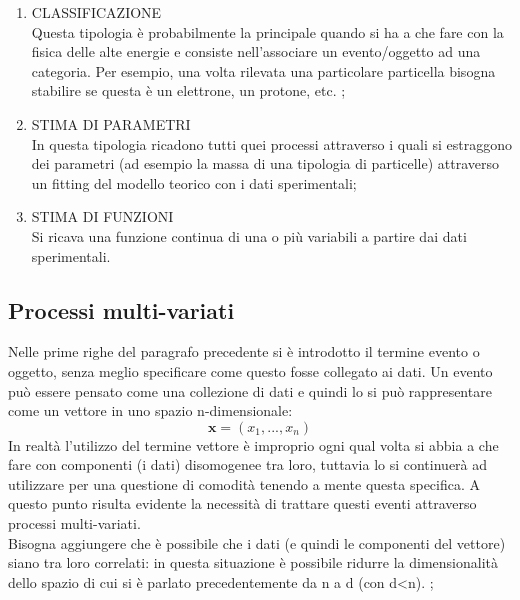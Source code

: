 	\begin{enumerate}
		\item CLASSIFICAZIONE \\
			Questa tipologia è probabilmente la principale quando si ha a che fare con la fisica delle alte energie e consiste nell'associare un evento/oggetto  ad una categoria. Per esempio, una volta rilevata una particolare particella bisogna stabilire se questa è un elettrone, un protone, etc.  ;
 
		\item STIMA DI PARAMETRI \\
			In questa tipologia ricadono tutti quei processi attraverso i quali si estraggono dei parametri (ad esempio la massa di una tipologia di particelle) attraverso un fitting del modello teorico con i dati sperimentali;
		\item STIMA DI FUNZIONI \\
			Si ricava una funzione continua di una o più variabili a partire dai dati sperimentali.
	\end{enumerate}

\subsection{Processi multi-variati}
\label{subsec:processi multi-variati}

	Nelle prime righe del paragrafo precedente si è introdotto il termine evento o oggetto, senza meglio specificare come questo fosse collegato ai dati. Un evento può essere pensato come una collezione di dati e quindi lo si può rappresentare come un vettore in uno spazio n-dimensionale: 
	\begin{equation}
		\textbf{x} = (x_{1},...,x_{n})
	\end{equation}
	In realtà l'utilizzo del termine vettore è improprio ogni qual volta si abbia a che fare con componenti (i dati) disomogenee tra loro, tuttavia lo si continuerà ad utilizzare per una questione di comodità tenendo a mente questa specifica. A questo punto risulta evidente la necessità di trattare questi eventi attraverso processi multi-variati.\\
	Bisogna aggiungere che è possibile che i dati (e quindi le componenti del vettore) siano tra loro correlati: in questa situazione è possibile ridurre la dimensionalità dello spazio di cui si è parlato precedentemente da n a d (con d<n).
;
	
